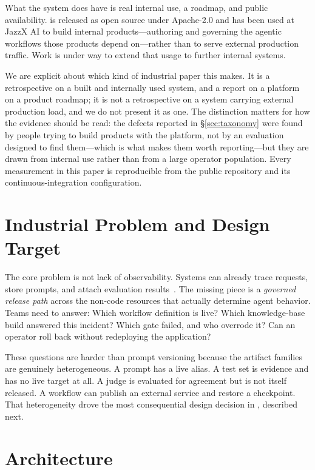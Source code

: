 \documentclass{article}
\begin{document}
What the system does have is real internal use, a roadmap, and public
availability. \sys is released as open source under Apache-2.0 and has been used at
JazzX AI to build internal products---authoring and governing the agentic workflows
those products depend on---rather than to serve external production traffic. Work is
under way to extend that usage to further internal systems.

We are explicit about which kind of industrial paper this makes. It is a
retrospective on a built and internally used system, and a report on a platform on a
product roadmap; it is not a retrospective on a system carrying external production
load, and we do not present it as one. The distinction matters for how the evidence
should be read: the defects reported in \S\ref{sec:taxonomy} were found by people
trying to build products with the platform, not by an evaluation designed to find
them---which is what makes them worth reporting---but they are drawn from internal
use rather than from a large operator population. Every measurement in this paper is
reproducible from the public repository and its continuous-integration
configuration.

\section{Industrial Problem and Design Target}

The core problem is not lack of observability. Systems can already trace requests,
store prompts, and attach evaluation results~\cite{mlflowgenai}. The missing piece
is a \emph{governed release path} across the non-code resources that actually
determine agent behavior. Teams need to answer: Which workflow definition is live?
Which knowledge-base build answered this incident? Which gate failed, and who
overrode it? Can an operator roll back without redeploying the application?

These questions are harder than prompt versioning because the artifact families are
genuinely heterogeneous. A prompt has a live alias. A test set is evidence and has
no live target at all. A judge is evaluated for agreement but is not itself
released. A workflow can publish an external service and restore a checkpoint. That
heterogeneity drove the most consequential design decision in \sys, described next.

\section{Architecture}
\label{sec:arch}
\end{document}
